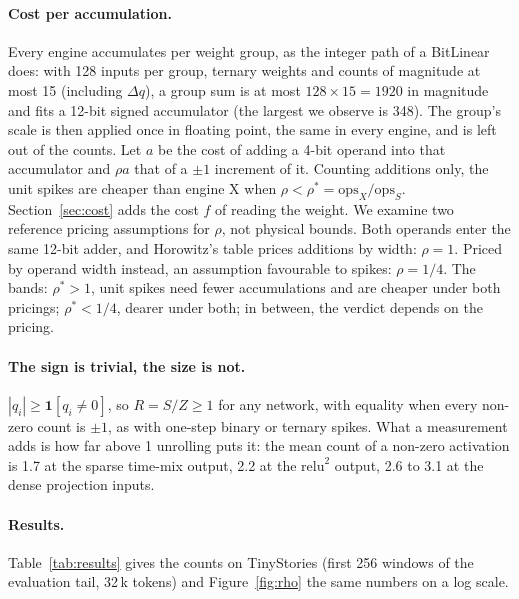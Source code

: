 \documentclass[11pt]{article}
\begin{document}
\paragraph{Cost per accumulation.} Every engine accumulates per weight group, as the integer
path of a BitLinear does: with 128 inputs per group, ternary weights and counts of magnitude at
most 15 (including $\Delta q$), a group sum is at most $128 \times 15 = 1920$ in magnitude and
fits a 12-bit signed accumulator (the largest we observe is 348). The group's scale is then
applied once in floating point, the same in every engine, and is left out of the counts. Let $a$
be the cost of adding a 4-bit operand into that accumulator and $\rho a$ that of a $\pm 1$
increment of it. Counting additions only, the unit spikes are cheaper than engine X when
$\rho < \rho^* = \mathrm{ops}_X/\mathrm{ops}_S$. Section~\ref{sec:cost} adds the cost $f$ of
reading the weight. We examine two reference pricing assumptions for $\rho$, not physical bounds.
Both operands enter the same 12-bit adder, and Horowitz's table prices additions by width:
$\rho = 1$. Priced by operand width instead, an assumption favourable to spikes: $\rho = 1/4$.
The bands: $\rho^* > 1$, unit spikes need fewer accumulations and are cheaper under both
pricings; $\rho^* < 1/4$, dearer under both; in between, the verdict depends on the pricing.

\paragraph{The sign is trivial, the size is not.} $|q_i| \geq \mathbf{1}[q_i \neq 0]$, so
$R = S/Z \geq 1$ for any network, with equality when every non-zero count is $\pm 1$, as with
one-step binary or ternary spikes. What a measurement adds is how far above 1 unrolling puts it:
the mean count of a non-zero activation is 1.7 at the sparse time-mix output, 2.2 at the
$\mathrm{relu}^2$ output, 2.6 to 3.1 at the dense projection inputs.

\paragraph{Results.} Table~\ref{tab:results} gives the counts on TinyStories (first 256 windows
of the evaluation tail, 32\,k tokens) and Figure~\ref{fig:rho} the same numbers on a log scale.
\end{document}
